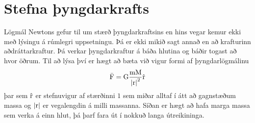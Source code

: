 \section{Stefna þyngdarkrafts}
Lögmál Newtons gefur til um stærð þyngdarkraftsins en hins vegar kemur ekki með
lýsingu á rúmlegri uppsetningu. Þá er ekki mikið sagt annað en
að krafturinn aðdráttarkraftur. Þá verkar þyngdarkraftur á báða hlutina
og báðir togast að hvor öðrum. Til að lýsa því er hægt að bæta við
vigur formi af þyngdarlögmálinu
\begin{equation}
	\bar{\textrm{F}}
		= \text{G} \frac{\textrm{m} \textrm{M}}{\left|\textrm{r}\right|^2} \hat {\textrm{r}}
\end{equation}
þar sem $\hat {\textrm{r}}$ er stefnuvigur af stærðinni $1$ sem miðar alltaf í átt
að gagnstæðum massa og $\left|\textrm{r}\right|$ er vegalengdin á milli massanna.
Síðan er hægt að hafa marga massa sem verka á einn hlut, þá þarf fara út í
nokkuð langa útreikininga.

